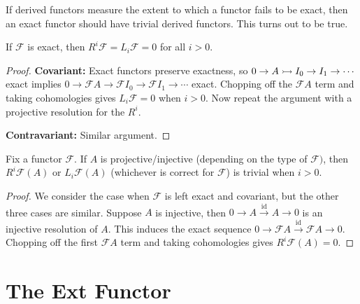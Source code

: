 \documentclass[twoside,10pt]{report}
\begin{document}

\begin{thrm}
\end{thrm}

If derived functors measure the extent to which a functor fails to be exact, then an exact functor should have trivial derived functors. This turns out to be true.

\begin{prop}
If $\mathcal{F}$ is exact, then $R^{i}\mathcal{F}=L_{i}\mathcal{F}=0$ for all $i>0$.
\end{prop}
\begin{proof}
	\textbf{Covariant:} Exact functors preserve exactness, so $0\to A\rightarrowtail I_0\to I_1\to \cdots$ exact implies $0\to \mathcal{F}A\to \mathcal{F}I_0\to \mathcal{F}I_1\to \cdots$ exact. Chopping off the $\mathcal{F}A$ term and taking cohomologies gives $L_{i}\mathcal{F} = 0$ when $i>0$. Now repeat the argument with a projective resolution for the $R^{i}$.

	\textbf{Contravariant:} Similar argument.
\end{proof}

\begin{prop}
	Fix a functor $\mathcal{F}$. If $A$ is projective/injective (depending on the type of $\mathcal{F})$, then $R^{i}\mathcal{F}(A)$ or $L_{i}\mathcal{F}(A)$ (whichever is correct for $\mathcal{F}$) is trivial when $i>0$.
\end{prop}
\begin{proof}
	We consider the case when $\mathcal{F}$ is left exact and covariant, but the other three cases are similar. Suppose $A$ is injective, then $0\to A\stackrel{\text{id}}{\to }  A\to 0$ is an injective resolution of $A$. This induces the exact sequence $0\to \mathcal{F}A \stackrel{\text{id}}{\to }  \mathcal{F}A \to 0$. Chopping off the first $\mathcal{F}A$ term and taking cohomologies gives $R^{i}\mathcal{F}(A)=0$.
\end{proof}



\section{The Ext Functor}
\end{document}
